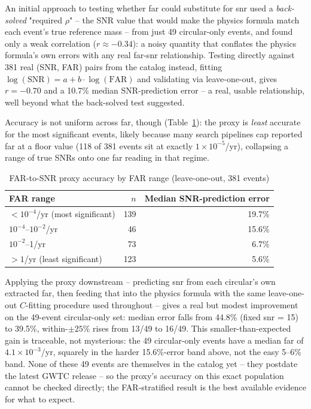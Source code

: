 An initial approach to testing whether \gls{far} could substitute for \gls{snr} used a \emph{back-solved} "required $\rho$" -- the SNR value that would make the physics formula match each event's true reference mass -- from just 49 circular-only events, and found only a weak correlation ($r \approx -0.34$): a noisy quantity that conflates the physics formula's own errors with any real \gls{far}-\gls{snr} relationship. Testing directly against 381 real (SNR, FAR) pairs from the catalog instead, fitting $\log(\text{SNR}) = a + b \cdot \log(\text{FAR})$ and validating via leave-one-out, gives $r = -0.70$ and a 10.7\% median SNR-prediction error -- a real, usable relationship, well beyond what the back-solved test suggested.

Accuracy is not uniform across \gls{far}, though (Table~\ref{tab:far-proxy}): the proxy is \emph{least} accurate for the most significant events, likely because many search pipelines cap reported \gls{far} at a floor value (118 of 381 events sit at exactly $1\times10^{-5}$/yr), collapsing a range of true SNRs onto one \gls{far} reading in that regime.

\begin{table}[H]
\centering
\caption{FAR-to-SNR proxy accuracy by FAR range (leave-one-out, 381 events)}
\label{tab:far-proxy}
\begin{tabular}{@{}lrr@{}}
\toprule
FAR range & $n$ & Median SNR-prediction error \\
\midrule
$<10^{-4}$/yr (most significant) & 139 & 19.7\% \\
$10^{-4}$--$10^{-2}$/yr & 46 & 15.6\% \\
$10^{-2}$--1/yr & 73 & 6.7\% \\
$>1$/yr (least significant) & 123 & 5.6\% \\
\bottomrule
\end{tabular}
\end{table}

Applying the proxy downstream -- predicting \gls{snr} from each circular's own extracted \gls{far}, then feeding that into the physics formula with the same leave-one-out $C$-fitting procedure used throughout -- gives a real but modest improvement on the 49-event circular-only set: median error falls from 44.8\% (fixed \gls{snr} = 15) to 39.5\%, within-$\pm25\%$ rises from 13/49 to 16/49. This smaller-than-expected gain is traceable, not mysterious: the 49 circular-only events have a median \gls{far} of $4.1\times10^{-3}$/yr, squarely in the harder 15.6\%-error band above, not the easy 5--6\% band. None of these 49 events are themselves in the catalog yet -- they postdate the latest GWTC release -- so the proxy's accuracy on this exact population cannot be checked directly; the FAR-stratified result is the best available evidence for what to expect.

